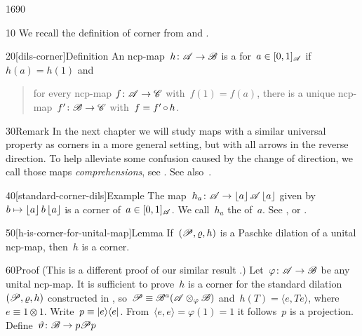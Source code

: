\begin{parsec}{1690}%
\begin{point}{10}%
We recall the definition of corner
        from \cite[dfn.~2]{westerbaan2016universal} and .
\end{point}
\begin{point}{20}[dils-corner]{Definition}%
An ncp-map~$h \colon \mathscr{A} \to \mathscr{B}$
is a  for~$a \in [0,1]_{\mathscr{A}}$ if~$h(a)=h(1)$
    and
    \begin{quote}
        for every ncp-map $f\colon \mathscr{A} \to \mathscr{C}$
            with~$f(1)=f(a)$,
            there is a unique ncp-map~$f'\colon \mathscr{B} \to \mathscr{C}$
            with~$f = f' \mathop{\circ} h$.
    \end{quote}
\spacingfix{}
\begin{point}{30}{Remark}%
In the next chapter we will study maps with a similar universal property
    as corners in a more general setting,
    but with all arrows in the reverse direction.
To help alleviate some confusion caused by the change of direction,
    we call those maps \emph{comprehensions},
    see .  See also~\cite{effintro}.
\end{point}
\end{point}
\begin{point}{40}[standard-corner-dils]{Example}%
    The map~$h_a \colon \mathscr{A} \to \left\lfloor a\right\rfloor \mathscr{A} \left\lfloor a\right\rfloor$ given
    by~$b \mapsto \left\lfloor a\right\rfloor b \left\lfloor a\right\rfloor$
    is a corner of~$a \in [0,1]_{\mathscr{A}}$.
    We call~$h_a$ the  of~$a$.
    See , 
        or \cite[prop.~5]{westerbaan2016universal}.
\end{point}
\begin{point}{50}[h-is-corner-for-unital-map]{Lemma}%
If~$(\mathscr{P}, \varrho, h)$ is a Paschke dilation of a unital ncp-map,
    then~$h$ is a corner.
\begin{point}{60}{Proof}%
(This is a different proof of our similar result \cite[cor.~27]{wwpaschke}.)
Let~$\varphi \colon \mathscr{A} \to \mathscr{B}$ be any unital ncp-map.
It is sufficient to prove~$h$
    is a corner for the
    standard dilation~$(\mathscr{P} , \varrho, h)$
    constructed in ,
    so~$\mathscr{P} \equiv \mathscr{B}^a(\mathscr{A} \otimes_\varphi \mathscr{B})$
    and~$h(T) = \langle e, T e\rangle$, where~$e \equiv 1\otimes 1$.
    Write~$p \equiv \left|e\right>\!\left<e\right|$.
From~$\langle e,e\rangle = \varphi(1) = 1$
    it follows~$p$ is a projection.
Define~$\vartheta\colon \mathscr{B} \to p \mathscr{P} p$

\end{point}
\end{point}
\end{parsec}
